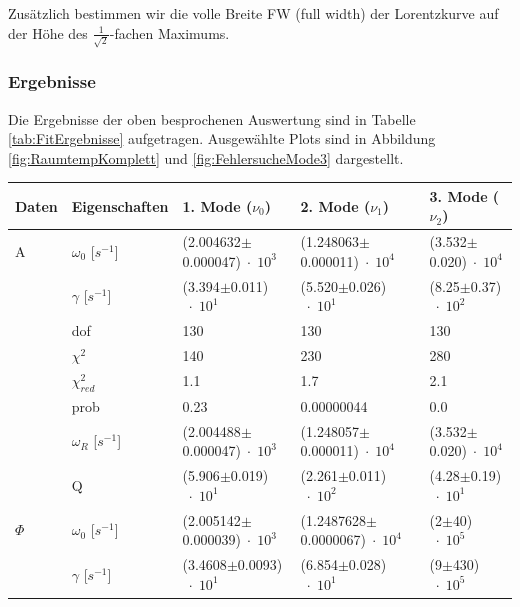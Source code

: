 Zusätzlich bestimmen wir die volle Breite FW (full width) der Lorentzkurve auf der Höhe des $\frac{1}{\sqrt{2}}$-fachen Maximums.

\subsubsection*{Ergebnisse}

Die Ergebnisse der oben besprochenen Auswertung sind in Tabelle \ref{tab:FitErgebnisse} aufgetragen.
Ausgewählte Plots sind in Abbildung \ref{fig:RaumtempKomplett} und \ref{fig:FehlersucheMode3} dargestellt.

\minipage{\linewidth}
    \begin{center}
        \captionsetup{type=table}
        \begin{adjustbox}{max width=\linewidth, keepaspectratio}
            \begin{tabular}{lllll}
            \toprule
            Daten & Eigenschaften & 1. Mode ($\nu_0$) & 2. Mode ($\nu_1$) & 3. Mode ($\nu_2$) \\
            \midrule
            A & $\omega_0$ [$s^{-1}$] & (2.004632$\pm$0.000047)$\;\cdot\; 10^{3}$ & (1.248063$\pm$0.000011)$\;\cdot\; 10^{4}$ & (3.532$\pm$0.020)$\;\cdot\; 10^{4}$ \\
            ~ & $\gamma$ [$s^{-1}$] & (3.394$\pm$0.011)$\;\cdot\; 10^{1}$ & (5.520$\pm$0.026)$\;\cdot\; 10^{1}$ & (8.25$\pm$0.37)$\;\cdot\; 10^{2}$ \\
            ~ & dof & 130 & 130 & 130 \\
            ~ & $\chi^2$ & 140 & 230 & 280 \\
            ~ & $\chi_{red}^2$ & 1.1 & 1.7 & 2.1 \\
            ~ & prob & 0.23 & 0.00000044 & 0.0 \\
            ~ & $\omega_R$ [$s^{-1}$] & (2.004488$\pm$0.000047)$\;\cdot\; 10^{3}$ & (1.248057$\pm$0.000011)$\;\cdot\; 10^{4}$ & (3.532$\pm$0.020)$\;\cdot\; 10^{4}$ \\
            ~ & Q & (5.906$\pm$0.019)$\;\cdot\; 10^{1}$ & (2.261$\pm$0.011)$\;\cdot\; 10^{2}$ & (4.28$\pm$0.19)$\;\cdot\; 10^{1}$ \\
            $\Phi$ & $\omega_0$ [$s^{-1}$] & (2.005142$\pm$0.000039)$\;\cdot\; 10^{3}$ & (1.2487628$\pm$0.0000067)$\;\cdot\; 10^{4}$ & (2$\pm$40)$\;\cdot\; 10^{5}$ \\
            ~ & $\gamma$ [$s^{-1}$] & (3.4608$\pm$0.0093)$\;\cdot\; 10^{1}$ & (6.854$\pm$0.028)$\;\cdot\; 10^{1}$ & (9$\pm$430)$\;\cdot\; 10^{5}$ \\

\end{tabular}
\end{adjustbox}
\end{center}
